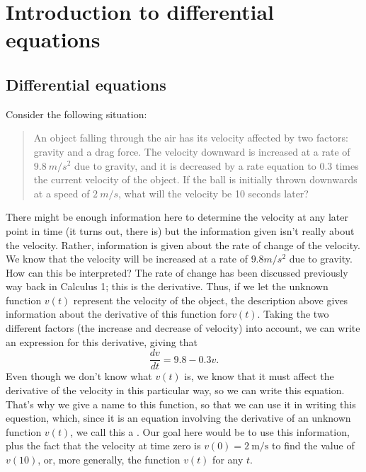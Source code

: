 \section{Introduction to differential equations}
\label{introde:section}




\subsection{Differential equations}

Consider the following situation:
\begin{quote}
An object falling through the air has its velocity affected by two factors: gravity and a drag force. The velocity downward is increased at a rate of $9.8\ m/s^2$ due to gravity, and it is decreased by a rate equation to $0.3$ times the current velocity of the object. If the ball is initially thrown downwards at a speed of $2\ m/s$, what will the velocity be 10 seconds later?
\end{quote}

There might be enough information here to determine the velocity at any later point in time (it turns out, there is) but the information given isn't really about the velocity. Rather, information is given about the rate of change of the velocity. We know that the velocity will be increased at a rate of $9.8 m/s^2$ due to gravity. How can this be interpreted? The rate of change has been discussed previously way back in Calculus 1; this is the derivative. Thus, if we let the unknown function $v(t)$ represent the velocity of the object, the description above gives information about the derivative of this function for$v(t)$. Taking the two different factors (the increase and decrease of velocity) into account, we can write an expression for this derivative, giving that
\begin{equation*}
\frac{dv}{dt} = 9.8 - 0.3v.
\end{equation*}
Even though we don't know what $v(t)$ is, we know that it must affect the derivative of the velocity in this particular way, so we can write this equation. That's why we give a name to this function, so that we can use it in writing this equestion, which, since it is an equation involving the derivative of an unknown function $v(t)$, we call this a . Our goal here would be to use this information, plus the fact that the velocity at time zero is $v(0) = 2\ \text{m/s}$ to find the value of $v(10)$, or, more generally, the function $v(t)$ for any $t$. 

